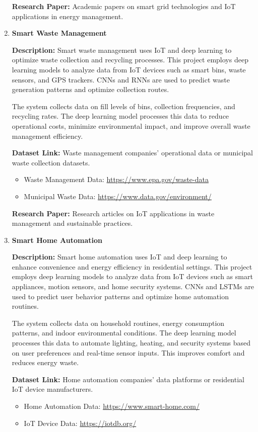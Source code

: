 \documentclass{article}
\begin{document}
\begin{enumerate}[label=\textbf{\arabic*.}, leftmargin=*]
\textbf{Research Paper:} Academic papers on smart grid technologies and IoT applications in energy management.

\item \textbf{Smart Waste Management}

\textbf{Description:}
Smart waste management uses IoT and deep learning to optimize waste collection and recycling processes. This project employs deep learning models to analyze data from IoT devices such as smart bins, waste sensors, and GPS trackers. CNNs and RNNs are used to predict waste generation patterns and optimize collection routes.

The system collects data on fill levels of bins, collection frequencies, and recycling rates. The deep learning model processes this data to reduce operational costs, minimize environmental impact, and improve overall waste management efficiency.

\textbf{Dataset Link:} Waste management companies' operational data or municipal waste collection datasets.
\begin{itemize}
    \item Waste Management Data: \url{https://www.epa.gov/waste-data}
    \item Municipal Waste Data: \url{https://www.data.gov/environment/}
\end{itemize}

\textbf{Research Paper:} Research articles on IoT applications in waste management and sustainable practices.

\item \textbf{Smart Home Automation}

\textbf{Description:}
Smart home automation uses IoT and deep learning to enhance convenience and energy efficiency in residential settings. This project employs deep learning models to analyze data from IoT devices such as smart appliances, motion sensors, and home security systems. CNNs and LSTMs are used to predict user behavior patterns and optimize home automation routines.

The system collects data on household routines, energy consumption patterns, and indoor environmental conditions. The deep learning model processes this data to automate lighting, heating, and security systems based on user preferences and real-time sensor inputs. This improves comfort and reduces energy waste.

\textbf{Dataset Link:} Home automation companies' data platforms or residential IoT device manufacturers.
\begin{itemize}
    \item Home Automation Data: \url{https://www.smart-home.com/}
    \item IoT Device Data: \url{https://iotdb.org/}
\end{itemize}


\end{enumerate}
\end{document}

